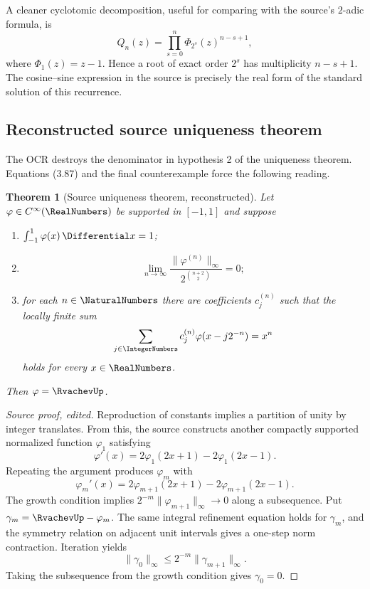 \documentclass[11pt,oneside]{article}
\numberwithin{equation}{section}
\newtheorem{theorem}{Theorem}[section]
\theoremstyle{definition}
\theoremstyle{remark}
\begin{document}
A cleaner cyclotomic decomposition, useful for comparing with the source's
$2$-adic formula, is
\begin{equation}\label{p6:eq:Qn-cyclotomic}
 Q_n(z)=\prod_{s=0}^{n}\Phi_{2^s}(z)^{n-s+1},
\end{equation}
where $\Phi_1(z)=z-1$.  Hence a root of exact order $2^s$ has multiplicity
$n-s+1$.  The cosine--sine expression in the source is precisely the real form
of the standard solution of this recurrence.

\subsection{Reconstructed source uniqueness theorem}

The OCR destroys the denominator in hypothesis 2 of the uniqueness theorem.
Equations (3.87) and the final counterexample force the following reading.

\begin{theorem}[Source uniqueness theorem, reconstructed]\label{p6:thm:source-uniqueness}
Let $\varphi\in C^\infty(\RealNumbers)$ be supported in $[-1,1]$ and suppose
\begin{enumerate}
\item $\int_{-1}^{1}\varphi(x)\,\Differential x=1$;
\item
\begin{equation}\label{p6:eq:source-growth-condition}
 \lim_{n\to\infty}
 \frac{\|\varphi^{(n)}\|_\infty}
 {2^{\binom{n+2}{2}}}=0;
\end{equation}
\item for each $n\in\NaturalNumbers$ there are coefficients $c_j^{(n)}$ such that the locally
finite sum
\[
 \sum_{j\in\IntegerNumbers}c_j^{(n)}\varphi(x-j2^{-n})=x^n
\]
holds for every $x\in\RealNumbers$.
\end{enumerate}
Then $\varphi=\RvachevUp$.
\end{theorem}

\begin{proof}[Source proof, edited]
Reproduction of constants implies a partition of unity by integer translates.
From this, the source constructs another compactly supported normalized function
$\varphi_1$ satisfying
\[
 \varphi'(x)=2\varphi_1(2x+1)-2\varphi_1(2x-1).
\]
Repeating the argument produces $\varphi_m$ with
\begin{equation}\label{p6:eq:phi-chain}
 \varphi_m'(x)=2\varphi_{m+1}(2x+1)-2\varphi_{m+1}(2x-1).
\end{equation}
The growth condition implies
$2^{-m}\|\varphi_{m+1}\|_\infty\to0$ along a subsequence.  Put
$\gamma_m=\RvachevUp-\varphi_m$.  The same integral refinement equation holds for
$\gamma_m$, and the symmetry relation on adjacent unit intervals gives a
one-step norm contraction.  Iteration yields
\[
 \|\gamma_0\|_\infty\le2^{-m}\|\gamma_{m+1}\|_\infty.
\]
Taking the subsequence from the growth condition gives $\gamma_0=0$.
\end{proof}
\end{document}
